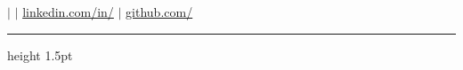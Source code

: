 
\begin{center}
    {\Huge\bfseries\name} \\[4pt]
    {\large\color{highlight}\role} \\[4pt]
    \small
    \phone \quad$|$\quad
    \href{mailto:\email}{\email} \quad$|$\quad
    \href{https://linkedin.com/in/\LinkedIn}{linkedin.com/in/\LinkedIn} \quad$|$\quad
    \href{https://github.com/\github}{github.com/\github}
\end{center}
\vspace{-8pt}
{\color{highlight}\hrule height 1.5pt}
\vspace{6pt}
